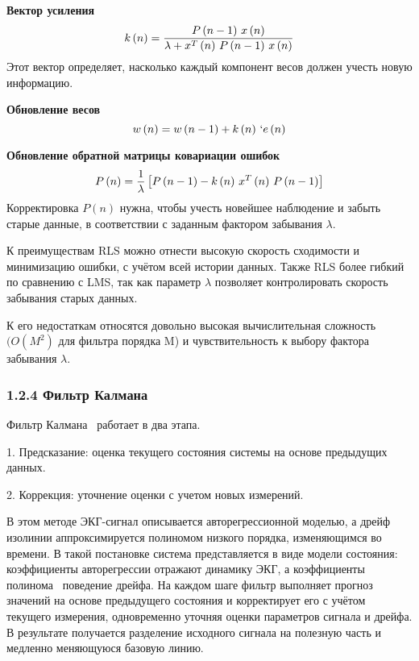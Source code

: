\documentclass[10pt,a5paper]{article}
\numberwithin{figure}{section}
\numberwithin{table}{section}
\begin{document}
\textbf{Вектор усиления}
\begin{equation*}
  k\left(n\right)=\frac{P\left(n-1\right)\thinspace x\left(n\right)}{\lambda+x^T\left(n\right)\thinspace P\left(n-1\right)\thinspace x\left(n\right)}
\end{equation*}
\noindent
Этот вектор определяет, насколько каждый компонент весов должен учесть новую информацию.

\textbf{Обновление весов}
\begin{equation*}
  w\left(n\right)=w\left(n-1\right)+k\left(n\right)\thinspace` e\left(n\right)
\end{equation*}

\textbf{Обновление обратной матрицы ковариации ошибок}
\begin{equation*}
  P\left(n\right)=\frac{1}{\lambda}\left[P\left(n-1\right)-k\left(n\right)\thinspace x^T\left(n\right)\thinspace P\left(n-1\right)\right]
\end{equation*}
\noindent
Корректировка $P\left(n\right)$ нужна, чтобы учесть новейшее наблюдение и забыть старые данные, в соответствии с заданным фактором забывания $\lambda$.

К преимуществам RLS можно отнести высокую скорость сходимости и минимизацию ошибки, с учётом всей истории данных. Также RLS более гибкий по сравнению с LMS, так как параметр $\lambda$ позволяет контролировать скорость забывания старых данных.

К его недостаткам относятся довольно высокая вычислительная сложность $(O\left(M^2\right)$ для фильтра порядка M) и чувствительность к выбору фактора забывания $\lambda$.

\subsubsection{1.2.4 Фильтр Калмана}
Фильтр Калмана~\cite{mneimneh2006} работает в два этапа.

1.	Предсказание: оценка текущего состояния системы на основе предыдущих данных.

2.	Коррекция: уточнение оценки с учетом новых измерений.

\noindent
В этом методе ЭКГ-сигнал описывается авторегрессионной моделью, а дрейф изолинии аппроксимируется полиномом низкого порядка, изменяющимся во времени. В такой постановке система представляется в виде модели состояния: коэффициенты авторегрессии отражают динамику ЭКГ, а коэффициенты полинома \textendash\ поведение дрейфа. На каждом шаге фильтр выполняет прогноз значений на основе предыдущего состояния и корректирует его с учётом текущего измерения, одновременно уточняя оценки параметров сигнала и дрейфа. В результате получается разделение исходного сигнала на полезную часть и медленно меняющуюся базовую линию.
\end{document}
